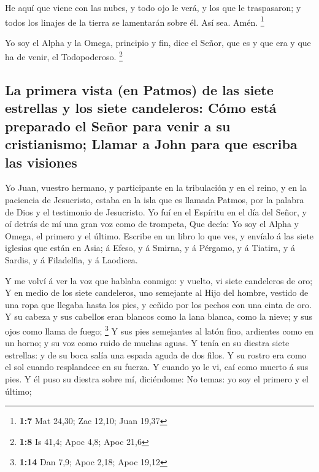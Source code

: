  He aquí que viene con las nubes, y todo ojo le verá, y
los que le traspasaron; y todos los linajes de la tierra se lamentarán
sobre él. Así sea. Amén. \footnote{\textbf{1:7} Mat 24,30; Zac 12,10;
  Juan 19,37}

 Yo soy el Alpha y la Omega, principio y fin, dice el
Señor, que es y que era y que ha de venir, el Todopoderoso. \footnote{\textbf{1:8}
  Is 41,4; Apoc 4,8; Apoc 21,6}

\hypertarget{la-primera-vista-en-patmos-de-las-siete-estrellas-y-los-siete-candeleros-cuxf3mo-estuxe1-preparado-el-seuxf1or-para-venir-a-su-cristianismo-llamar-a-john-para-que-escriba-las-visiones}{%
\subsection{La primera vista (en Patmos) de las siete estrellas y los
siete candeleros: Cómo está preparado el Señor para venir a su
cristianismo; Llamar a John para que escriba las
visiones}\label{la-primera-vista-en-patmos-de-las-siete-estrellas-y-los-siete-candeleros-cuxf3mo-estuxe1-preparado-el-seuxf1or-para-venir-a-su-cristianismo-llamar-a-john-para-que-escriba-las-visiones}}

 Yo Juan, vuestro hermano, y participante en la
tribulación y en el reino, y en la paciencia de Jesucristo, estaba en la
isla que es llamada Patmos, por la palabra de Dios y el testimonio de
Jesucristo.  Yo fuí en el Espíritu en el día del Señor, y
oí detrás de mí una gran voz como de trompeta,  Que
decía: Yo soy el Alpha y Omega, el primero y el último. Escribe en un
libro lo que ves, y envíalo á las siete iglesias que están en Asia; á
Efeso, y á Smirna, y á Pérgamo, y á Tiatira, y á Sardis, y á Filadelfia,
y á Laodicea.

 Y me volví á ver la voz que hablaba conmigo: y vuelto,
vi siete candeleros de oro;  Y en medio de los siete
candeleros, uno semejante al Hijo del hombre, vestido de una ropa que
llegaba hasta los pies, y ceñido por los pechos con una cinta de oro.
 Y su cabeza y sus cabellos eran blancos como la lana
blanca, como la nieve; y sus ojos como llama de fuego; \footnote{\textbf{1:14}
  Dan 7,9; Apoc 2,18; Apoc 19,12}  Y sus pies semejantes
al latón fino, ardientes como en un horno; y su voz como ruido de muchas
aguas.  Y tenía en su diestra siete estrellas: y de su
boca salía una espada aguda de dos filos. Y su rostro era como el sol
cuando resplandece en su fuerza.  Y cuando yo le vi, caí
como muerto á sus pies. Y él puso su diestra sobre mí, diciéndome: No
temas: yo soy el primero y el último;


